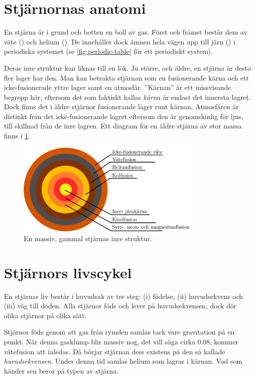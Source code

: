 \section{Stjärnornas anatomi}
En stjärna är i grund och botten en boll av gas. Först och främst består dem av väte () och helium (). De innehåller dock ämnen hela vägen upp till järn () i periodiska systemet (se \vref{fig:periodic-table} för ett periodiskt system).

Deras inre struktur kan liknas till en lök. Ju större, och äldre, en stjärna är desto fler lager har den. Man kan betrakta stjärnan som en fusionerande kärna och ett icke-fusionerade yttre lager samt en atmosfär. ''Kärnan'' är ett missvisande begrepp här, eftersom det som faktiskt kallas \emph{kärna} är endast det innersta lagret. Dock finns det i äldre stjärnor fusionerande lager runt kärnan. Atmosfären är distinkt från det icke-fusionerande lagret eftersom den är genomskinlig för ljus, till skillnad från de inre lagren. Ett diagram för en äldre stjärna av stor massa finns i \cref{fig:star-anatomy}.
\begin{figure}[h!]
    \centering
    \includegraphics[width=0.8\textwidth]{img/star.png}
    \caption{En massiv, gammal stjärnas inre struktur.}
    \label{fig:star-anatomy}
\end{figure}

\section{Stjärnors livscykel}
En stjärnas liv består i huvudsak av tre steg: (i) födelse, (ii) huvudsekvens och (iii) väg till döden. Alla stjärnor föds och lever på huvudsekvensen, dock dör olika stjärnor på olika sätt.

Stjärnor föds genom att gas från rymden samlas tack vare gravitation på en punkt. När denna gasklump blir massiv nog, det vill säga cirka \qty{0.08}{\Mo}, kommer vätefusion att inledas. Då börjar stjärnan dess existens på den så kallade \emph{huvudsekvensen}. Under denna tid samlas helium som lagras i kärnan. Vad som händer sen beror på typen av stjärna.

